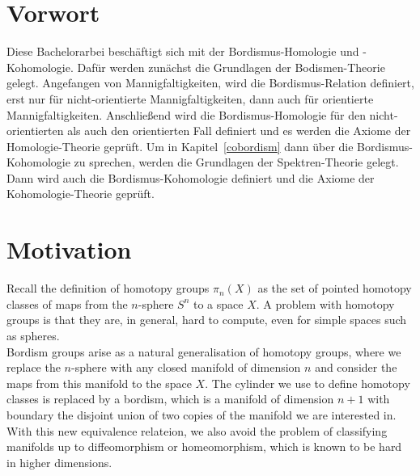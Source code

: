 \documentclass[a4paper,12pt]{article}
\begin{document}
\maketitle
{}
\tableofcontents\newpage

\begin{comment}
\newgeometry{
	left=20mm, %
    top=25mm,
    right=20mm, %
  bmargin=2cm %
}
\end{comment}

\setcounter{section}{-1}

\section*{Vorwort}
Diese Bachelorarbei besch\"aftigt sich mit der Bordismus-Homologie und -Kohomologie. Daf\"ur werden zun\"achst die Grundlagen der Bodismen-Theorie gelegt. 
Angefangen von Mannigfaltigkeiten, wird die Bordismus-Relation definiert, erst nur f\"ur nicht-orientierte Mannigfaltigkeiten, dann auch f\"ur orientierte Mannigfaltigkeiten.
Anschlie\ss end wird die Bordismus-Homologie f\"ur den nicht-orientierten als auch den orientierten Fall definiert und es werden die Axiome der Homologie-Theorie gepr\"uft.
Um in Kapitel\ \ref{cobordism} dann \"uber die Bordismus-Kohomologie zu sprechen, werden die Grundlagen der Spektren-Theorie gelegt. Dann wird auch die Bordismus-Kohomologie definiert und die Axiome der Kohomologie-Theorie gepr\"uft.


\section{Motivation}

Recall the definition of homotopy groups \(\pi_n(X)\) as the set of pointed homotopy classes of maps from the \(n\)-sphere \(S^n\) to a space \(X\). 
A problem with homotopy groups is that they are, in general, hard to compute, even for simple spaces such as spheres.\\
Bordism groups arise as a natural generalisation of homotopy groups, where we replace the \(n\)-sphere with any closed manifold of dimension \(n\) and consider the maps from this manifold to the space \(X\). The cylinder we use to define homotopy classes is replaced by a bordism, which is a manifold of dimension \(n+1\) with boundary the disjoint union of two copies of the manifold we are interested in. With this new equivalence relateion, we also avoid the problem of classifying manifolds up to diffeomorphism or homeomorphism, which is known to be hard in higher dimensions.
\end{document}
